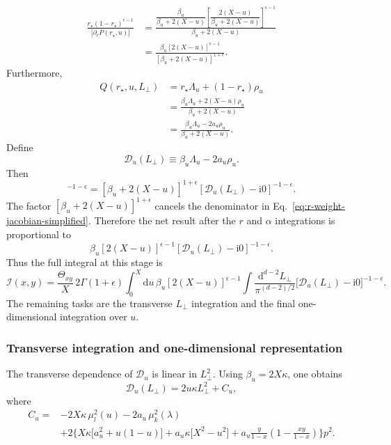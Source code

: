 \documentclass[11pt]{article}
\newcommand{\dd}{\mathrm d}
\newcommand{\ii}{\mathrm i}
\newcommand{\eps}{\epsilon}
\begin{document}
\begin{align}
\frac{r_\star(1-r_\star)^{\eps-1}}{|\partial_rP(r_\star,u)|}
&=
\frac{
\dfrac{\beta_u}{\beta_u+2(X-u)}
\left[
\dfrac{2(X-u)}{\beta_u+2(X-u)}
\right]^{\eps-1}
}{\beta_u+2(X-u)}
\nonumber\\
&=
\frac{
\beta_u[2(X-u)]^{\eps-1}
}{[\beta_u+2(X-u)]^{1+\eps}}.
\label{eq:r-weight-jacobian-simplified}
\end{align}
Furthermore,
\begin{align}
Q(r_\star,u,L_\perp)
&=r_\star\Lambda_u+(1-r_\star)\rho_u
\nonumber\\
&=
\frac{\beta_u\Lambda_u+2(X-u)\rho_u}{\beta_u+2(X-u)}
\nonumber\\
&=
\frac{\beta_u\Lambda_u-2a_u\rho_u}{\beta_u+2(X-u)}.
\label{eq:Q-root-before-D}
\end{align}
Define
\begin{equation}
\mathcal D_u(L_\perp)
\equiv
\beta_u\Lambda_u-2a_u\rho_u.
\label{eq:D-u-def}
\end{equation}
Then
\begin{equation}
[Q(r_\star,u,L_\perp)+\ii0]^{-1-\eps}
=
[\beta_u+2(X-u)]^{1+\eps}
[\mathcal D_u(L_\perp)-\ii0]^{-1-\eps}.
\label{eq:Q-cancel-factor}
\end{equation}
 The factor $[\beta_u+2(X-u)]^{1+\eps}$ cancels the denominator in Eq.~\eqref{eq:r-weight-jacobian-simplified}.  Therefore the net result after the $r$ and $\alpha$ integrations is proportional to
\begin{equation}
\beta_u[2(X-u)]^{\eps-1}
[\mathcal D_u(L_\perp)-\ii0]^{-1-\eps}.
\end{equation}
Thus the full integral at this stage is
\begin{equation}
\boxed{
\mathcal I(x,y)
=
\frac{\Theta_{xy}}{X}\,
2\Gamma(1+\eps)
\int_0^X\dd u\,
\beta_u[2(X-u)]^{\eps-1}
\int\frac{\dd^{d-2}L_\perp}{\pi^{(d-2)/2}}
\bigl[\mathcal D_u(L_\perp)-\ii0\bigr]^{-1-\eps}.
}
\label{eq:status-after-alpha-before-Lperp}
\end{equation}
The remaining tasks are the transverse $L_\perp$ integration and the final one-dimensional integration over $u$.

\subsubsection{Transverse integration and one-dimensional representation}

The transverse dependence of $\mathcal D_u$ is linear in $L_\perp^2$.  Using $\beta_u=2X\kappa$, one obtains
\begin{equation}
\mathcal D_u(L_\perp)=2u\kappa L_\perp^2+C_u,
\label{eq:D-u-linear}
\end{equation}
where
\begin{align}
C_u={}&
-2X\kappa\,\mu_l^2(u)-2a_u\,\mu_k^2(\lambda)
\nonumber\\
&+2\Biggl\{
X\kappa\bigl[a_u^2+u(1-u)\bigr]
+a_u\kappa\bigl[X^2-u^2\bigr]
+a_u\frac{y}{1-x}\left(1-\frac{xy}{1-x}\right)
\Biggr\}p^2.
\label{eq:C-u-def}
\end{align}
\end{document}
